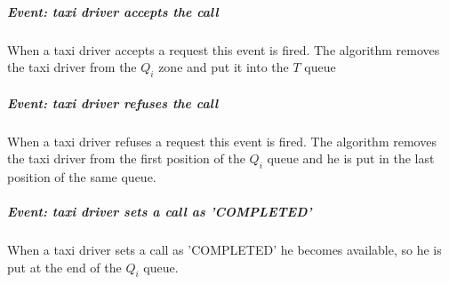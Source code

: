 \subparagraph{Event: taxi driver accepts the call}
When a taxi driver accepts a request this event is fired. 
The algorithm removes the taxi driver from the $Q_i$ zone and put it into the $T$ queue

\subparagraph{Event: taxi driver refuses the call}
When a taxi driver refuses a request this event is fired. 
The algorithm removes the taxi driver from the first position of the $Q_i$ queue and he is put in the last position of the same queue.

\subparagraph{Event: taxi driver sets a call as 'COMPLETED'}
When a taxi driver sets a call as 'COMPLETED' he becomes available, so he is put at the end of the $Q_i$ queue.